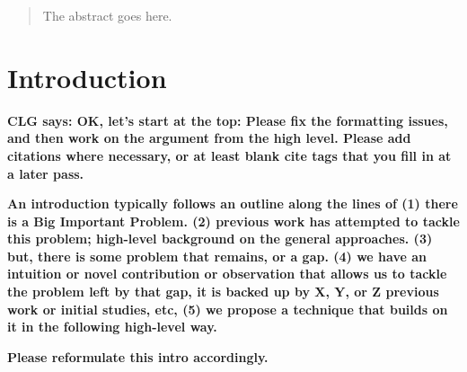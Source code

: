 \documentclass[conference]{IEEEtran}
\newcommand{\todo}[1]
  {{\scriptsize \textbf{\color{red} {#1}}}}
\begin{document}




\maketitle

\begin{abstract}
The abstract goes here.
\end{abstract}





%
\IEEEpeerreviewmaketitle



\section{Introduction}

\todo{CLG says: OK, let's start at the top: Please fix the formatting issues,
  and then work on the argument from the high level.  Please add citations where
  necessary, or at least blank cite tags that you fill in at a later pass.}

\todo{An introduction typically follows an outline along the lines of (1) there
  is a Big Important Problem.  (2) previous work has attempted to tackle this
  problem; high-level background on the general approaches.  (3) but, there is
  some problem that remains, or a gap.  (4) we have an intuition or novel
  contribution or observation that allows us to tackle the problem left by that
  gap, it is backed up by X, Y, or Z previous work or initial studies, etc, (5)
  we propose a technique that builds on it in the following high-level way.}

\todo{Please reformulate this intro accordingly.}
\end{document}
